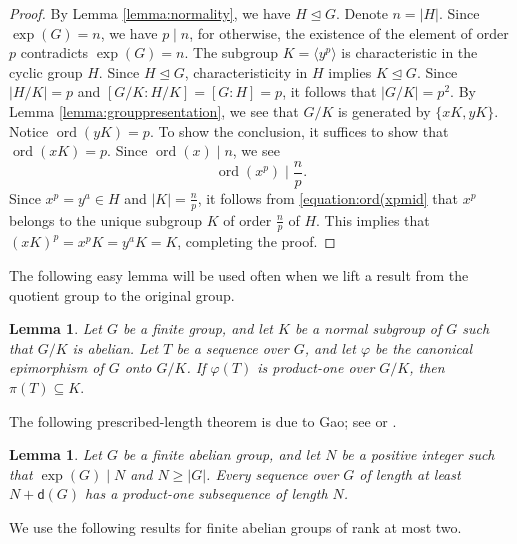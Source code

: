 \documentclass[a4paper, 12pt]{article}
\newtheorem{lemma}[theorem]{Lemma}
\theoremstyle{definition}
\DeclareMathOperator{\ord}{ord}
\begin{document}
\begin{proof} By Lemma \ref{lemma:normality}, we have $H\trianglelefteq G$.
Denote $n=|H|$. Since $\exp(G)=n$, we have $p\mid n$, for otherwise, the existence of the element of order $p$ contradicts $\exp(G)=n$. The subgroup $K=\langle y^p\rangle$ is characteristic in the cyclic
group $H$.  Since $H\trianglelefteq G$, characteristicity in $H$
implies $K\trianglelefteq G$. Since
$|H/K|=p$ and
$[G/K:H/K]=[G:H]=p$,
it follows that $|G/K|=p^2$. By Lemma \ref{lemma:grouppresentation}, we see that $G/K$ is generated by $\{xK,yK\}$. Notice $\ord(yK)=p$. To show the conclusion, it suffices to show that $\ord(xK)=p$. Since $\ord(x)\mid n$, we see
\begin{equation}\label{equation:ord(xpmid}
\ord(x^p)\mid \frac{n}{p}.
\end{equation} Since $x^p=y^a\in H$ and $|K|=\frac{n}{p}$, it follows from \eqref{equation:ord(xpmid} that $x^p$ belongs to the unique subgroup $K$ of order $\frac{n}{p}$ of $H$. This implies that $(xK)^p=x^p K=y^a K=K$, completing the proof.
\end{proof}


The following easy lemma will be used often when we lift a result from the quotient group to the original group.

\begin{lemma}\label{lemma:quotientlifting} Let $G$ be a finite group, and let $K$ be a normal subgroup of $G$ such that $G/K$ is abelian.  Let $T$ be a sequence over $G$, and let $\varphi$ be the canonical epimorphism of $G$ onto $G/K$. If $\varphi(T)$ is product-one over $G/K$, then
$\pi(T)\subseteq K.$
\end{lemma}

The following prescribed-length theorem is due to Gao; see
\cite[Theorem 3.2]{GaoRestrictedII} or
\cite[Theorem 6.10(2)]{GaoGeroldingersurvey}.

\begin{lemma}\label{lemma:gao>D+G-1}
Let $G$ be a finite abelian group,
and let $N$ be a positive integer
such that $\exp(G)\mid N$ and $N\geq |G|$.  Every sequence over $G$ of
length at least $N+\mathsf d(G)$
has a product-one subsequence of length $N$.
\end{lemma}



We use the following results for finite abelian groups of rank at most two.
\end{document}
